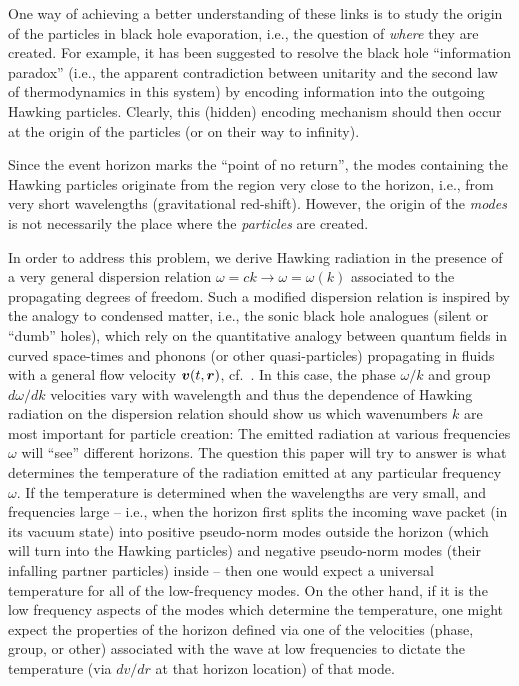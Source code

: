 \documentclass[aps,prl,showpacs,amssymb,nofootinbib,twocolumn]{revtex4}
\newcommand{\f}[1]{\mbox{\boldmath$#1$}}
\newcommand{\vau}{\mbox{\boldmath$v$}}
\begin{document}
One way of achieving a better understanding of these links is to study
the origin of the particles in black hole evaporation, i.e., the
question of {\em where} they are created.
%
For example, it has been suggested to resolve the black hole 
``information paradox'' (i.e., the apparent contradiction between
unitarity and the second law of thermodynamics in this system) 
by encoding information into the outgoing Hawking particles.
%
Clearly, this (hidden) encoding mechanism should then occur at
the origin of the particles (or on their way to infinity). 

Since the event horizon marks the ``point of no return'', the modes 
containing the Hawking particles originate from the region very close
to the horizon, i.e., from very short wavelengths 
(gravitational red-shift). 
%
However, the origin of the {\em modes} is not necessarily the place
where the {\em particles} are created.

In order to address this problem, we derive Hawking radiation in the 
presence of a very general dispersion relation 
$\omega=ck\to\omega=\omega(k)$ associated to the propagating degrees
of freedom.
%
Such a modified dispersion relation is inspired by the analogy to 
condensed matter, i.e., the sonic black hole analogues 
(silent or ``dumb'' holes), which rely on the quantitative analogy
between quantum fields in curved space-times and phonons 
(or other quasi-particles) propagating in fluids with a general flow
velocity $\vau(t,\f{r})$, cf.~\cite{unruh-prl,jacobson}. 
%
In this case, the phase $\omega/k$ and group  $d\omega/dk$ velocities
vary with wavelength and thus the dependence of Hawking radiation on
the dispersion relation should show us which wavenumbers $k$ are most
important for particle creation: 
The emitted radiation at various frequencies $\omega$ will ``see'' 
different horizons. 
%
The question this paper will try to answer is what determines the
temperature of the radiation emitted at any particular frequency
$\omega$. 
%
If the temperature is determined when the wavelengths are very small, 
and frequencies large -- i.e., when the horizon first splits the
incoming wave packet (in its vacuum state) into positive pseudo-norm
modes outside the horizon (which will turn into the Hawking particles) 
and negative pseudo-norm modes (their infalling partner particles)
inside -- then one would expect a universal temperature for all of the
low-frequency modes. 
%
On the other hand, if it is the low frequency aspects of the modes
which determine the temperature, one might expect the properties of
the horizon defined via one of the velocities (phase, group, or other)
associated with the wave at low frequencies to dictate the temperature
(via $dv/dr$ at that horizon location) of that mode.
\end{document}
